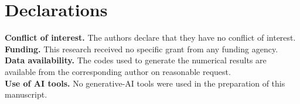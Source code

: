 \documentclass[11pt]{ajam}
\begin{document}
\section*{Declarations}
\noindent\textbf{Conflict of interest.} The authors declare that they have
no conflict of interest.\\
\textbf{Funding.} This research received no specific grant from any funding
agency.\\
\textbf{Data availability.} The codes used to generate the numerical
results are available from the corresponding author on reasonable request.\\
\textbf{Use of AI tools.} No generative-AI tools were used in the
preparation of this manuscript.


\end{document}
